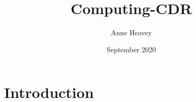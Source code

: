 \documentclass{article}
\title{Computing-CDR}
\author{Anne Heavey}
\date{September 2020}
\begin{document}
\maketitle

\section{Introduction}
\end{document}
